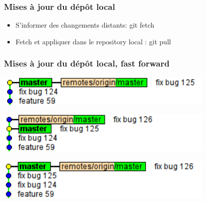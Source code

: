 
\begin{frame}[fragile]\frametitle{Mises à jour du dépôt local}
  \begin{itemize}
    \item S'informer des changements distants: \alert{git fetch}
    \item Fetch et appliquer dans le repository local : \alert{git pull}
  \end{itemize}

\end{frame}
\begin{frame}[fragile]\frametitle{Mises à jour du dépôt local, fast forward}
  \begin{center}
    \includegraphics[width=0.8\textwidth]{./images/merge-0.png}
  \end{center}
  \pause
  \hfill
  \begin{center}
    \includegraphics[width=0.8\textwidth]{./images/merge-1.png}
  \end{center}
  \pause
  \hfill
  \begin{center}
    \includegraphics[width=0.8\textwidth]{./images/merge-2.png}
  \end{center}
\end{frame}
